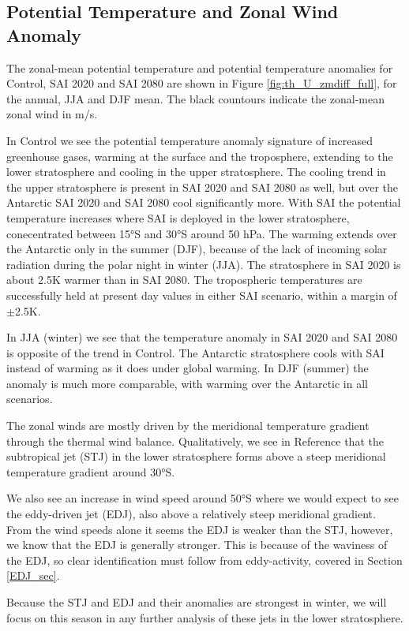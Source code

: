 \subsection{Potential Temperature and Zonal Wind Anomaly}
The zonal-mean potential temperature and potential temperature anomalies for Control, SAI 2020 and SAI 2080 are shown in Figure \ref{fig:th_U_zmdiff_full}, for the annual, JJA and DJF mean. The black countours indicate the zonal-mean zonal wind in m/s. 

In Control we see the potential temperature anomaly signature of increased greenhouse gases, warming at the surface and the troposphere, extending to the lower stratosphere and cooling in the upper stratosphere. The cooling trend in the upper stratosphere is present in SAI 2020 and SAI 2080 as well, but over the Antarctic SAI 2020 and SAI 2080 cool significantly more. With SAI the potential temperature increases where SAI is deployed in the lower stratosphere, conecentrated between 15°S and 30°S around 50 hPa. The warming extends over the Antarctic only in the summer (DJF), because of the lack of incoming solar radiation during the polar night in winter (JJA). The stratosphere in SAI 2020 is about 2.5K warmer than in SAI 2080. The tropospheric temperatures are successfully held at present day values in either SAI scenario, within a margin of $\pm$2.5K.

In JJA (winter) we see that the temperature anomaly in SAI 2020 and SAI 2080 is opposite of the trend in Control. The Antarctic stratosphere cools with SAI instead of warming as it does under global warming. In DJF (summer) the anomaly is much more comparable, with warming over the Antarctic in all scenarios.

The zonal winds are mostly driven by the meridional temperature gradient through the thermal wind balance. Qualitatively, we see in Reference that the subtropical jet (STJ) in the lower stratosphere forms above a steep meridional temperature gradient around 30°S.

We also see an increase in wind speed around 50°S where we would expect to see the eddy-driven jet (EDJ), also above a relatively steep meridional gradient. From the wind speeds alone it seems the EDJ is weaker than the STJ, however, we know that the EDJ is generally stronger. This is because of the waviness of the EDJ, so clear identification must follow from eddy-activity, covered in Section \ref{EDJ_sec}. 

Because the STJ and EDJ and their anomalies are strongest in winter, we will focus on this season in any further analysis of these jets in the lower stratosphere.

